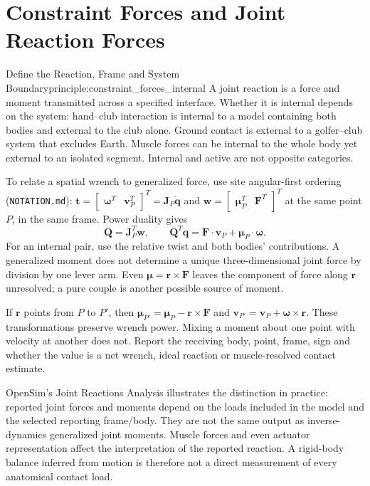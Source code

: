 \section{Constraint Forces and Joint Reaction Forces}
\label{sec:constraint_vs_reaction_forces}

\begin{principle}{Define the Reaction, Frame and System Boundary}{principle:constraint_forces_internal}
A joint reaction is a force and moment transmitted across a specified interface. Whether it is internal depends on the system: hand--club interaction is internal to a model containing both bodies and external to the club alone. Ground contact is external to a golfer--club system that excludes Earth. Muscle forces can be internal to the whole body yet external to an isolated segment. Internal and active are not opposite categories.

To relate a spatial wrench to generalized force, use site angular-first ordering
(\texttt{NOTATION.md}):
$\bm t=\begin{bmatrix}\bm\omega^T&\bm v_P^T\end{bmatrix}^T=\bm J_P\dot{\bm q}$ and
$\bm w=\begin{bmatrix}\bm\mu_P^T&\bm F^T\end{bmatrix}^T$ at the same point $P$, in the same
frame. Power duality gives
\begin{equation}
\bm Q=\bm J_P^T\bm w,
\qquad \bm Q^T\dot{\bm q}=\bm F\cdot\bm v_P+\bm\mu_P\cdot\bm\omega.
\label{eq:joint_force_from_constraint}
\end{equation}
For an internal pair, use the relative twist and both bodies' contributions. A generalized moment does not determine a unique three-dimensional joint force by division by one lever arm. Even $\bm\mu=\bm r\times\bm F$ leaves the component of force along $\bm r$ unresolved; a pure couple is another possible source of moment.

If $\bm r$ points from $P$ to $P'$, then $\bm\mu_{P'}=\bm\mu_P-\bm r\times\bm F$ and $\bm v_{P'}=\bm v_P+\bm\omega\times\bm r$. These transformations preserve wrench power. Mixing a moment about one point with velocity at another does not. Report the receiving body, point, frame, sign and whether the value is a net wrench, ideal reaction or muscle-resolved contact estimate.
\end{principle}

OpenSim's Joint Reactions Analysis illustrates the distinction in practice: reported joint forces and moments depend on the loads included in the model and the selected reporting frame/body. They are not the same output as inverse-dynamics generalized joint moments. Muscle forces and even actuator representation affect the interpretation of the reported reaction. A rigid-body balance inferred from motion is therefore not a direct measurement of every anatomical contact load. \citep{OpenSimJointReactions2019}

